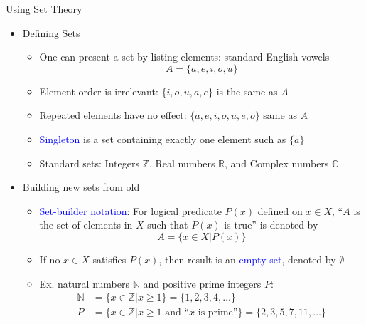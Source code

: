 \documentclass[10pt,english]{beamer}
\begin{document}
\begin{frame}{Using Set Theory}

\begin{itemize}
\setlength\itemsep{3mm}
\item<1-> Defining Sets \vspace{1mm}
\begin{itemize} 
  \setlength\itemsep{1.5mm}
  \item One can present a set by listing elements: standard English vowels \[A= \{ a,e,i,o,u \} \]
  \item Element order is irrelevant: $\{ i,o,u,a,e \}$ is the same as $A$
  \item Repeated elements have no effect: $\{ a,e,i,o,u,e,o \}$ same as $A$
  \item \textcolor{blue}{Singleton} is a set containing exactly one element such as $\{a\}$
  \item Standard sets: Integers $\mathbb{Z}$, Real numbers $\mathbb{R}$, and Complex numbers $\mathbb{C}$
\end{itemize}

\item<2-> Building new sets from old \vspace{1mm}
\begin{itemize} 
  \setlength\itemsep{1.5mm}
  \item \textcolor{blue}{Set-builder notation}: For logical predicate $P(x)$ defined on $x\in X$, ``$A$ is the set of elements in $X$ such that $P(x)$ is true'' is denoted by
\[ A = \{ x\in X | P(x) \} \]
  \item If no $x\in X$ satisfies $P(x)$, then result is an \textcolor{blue}{empty set}, denoted by $\emptyset$
  \item Ex. natural numbers $\mathbb{N}$ and positive prime integers $P$:
\begin{align*}
  \mathbb{N} &= \{ x\in \mathbb{Z} | x\geq 1 \} = \{ 1,2,3,4,\ldots \} \\
  P &= \{ x\in \mathbb{Z} | x\geq 1 \textrm{ and ``}x\textrm{ is prime''} \} = \{ 2,3,5,7,11,\ldots \}
\end{align*}
\end{itemize}
\end{itemize}
\end{frame}

\iffalse
\begin{frame}{Intervals?}

\begin{itemize}
\setlength\itemsep{3mm}
\item<1-> Defining Sets \vspace{1mm}
\begin{itemize} 
  \setlength\itemsep{1.5mm}


\end{itemize}
\end{itemize}
\end{frame}
\fi
\end{document}
